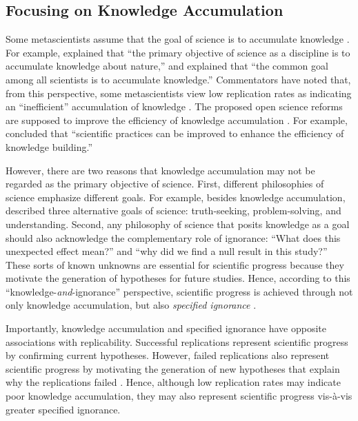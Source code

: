 \documentclass[authordate, meta]{jote-new-article}
\begin{document}
\subsection{Focusing on Knowledge Accumulation}



Some metascientists assume that the goal of science is to accumulate knowledge \parencites[e.g.,][p. 1]{Errington2021b}{Munafò2017}{Nosek2012}{Vazire2018}. For example, \textcite[p. 617]{Nosek2012} explained that “the primary objective of science as a discipline is to accumulate knowledge about nature,” and \textcite[p. 416]{Vazire2018} explained that “the common goal among all scientists is to accumulate knowledge.” Commentators have noted that, from this perspective, some metascientists view low replication rates as indicating an “inefficient” accumulation of knowledge \parencites{Morawski2022}{Peterson2021}[for examples, see][]{Errington2021b}{Munafò2017}{Nosek2012}{Vazire2018}[for discussions, see][]{Hostler2022}{UygunTunç2022}. The proposed open science reforms are supposed to improve the efficiency of knowledge accumulation \parencites[e.g.,][p. 37]{Chambers2022}[p. 626]{Nosek2012}. For example, \textcite[p. 626]{Nosek2012} concluded that “scientific practices can be improved to enhance the efficiency of knowledge building.”



However, there are two reasons that knowledge accumulation may not be regarded as the primary objective of science. First, different philosophies of science emphasize different goals. For example, besides knowledge accumulation, \textcite{Dellsén2018} described three alternative goals of science: truth-seeking, problem-solving, and understanding. Second, any philosophy of science that posits knowledge as a goal should also acknowledge the complementary role of ignorance: “What does this unexpected effect mean?” and “why did we find a null result in this study?” These sorts of known unknowns are essential for scientific progress because they motivate the generation of hypotheses for future studies. Hence, according to this “knowledge-\emph{and}-ignorance” perspective, scientific progress is achieved through not only knowledge accumulation, but also \emph{specified ignorance} \parencites{Firestein2012}{Merton1987}[][p. 7]{Collaboration2015}[p. 5826]{Rubin2021a}{Smithson1996}.



Importantly, knowledge accumulation and specified ignorance have opposite associations with replicability. Successful replications represent scientific progress by confirming current hypotheses. However, failed replications also represent scientific progress by motivating the generation of new hypotheses that explain why the replications failed \parencites[e.g., by positing boundary conditions; for an example, see][]{Firestein2012}. Hence, although low replication rates may indicate poor knowledge accumulation, they may also represent scientific progress vis-à-vis greater specified ignorance.
\end{document}

